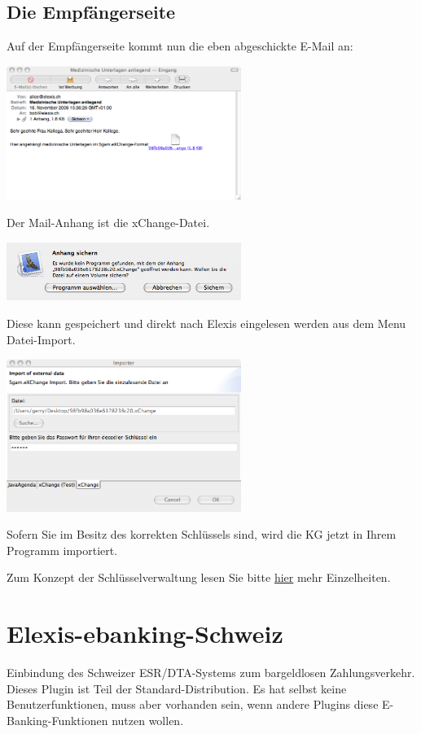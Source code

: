 \subsection{Die Empfängerseite}
Auf der Empfängerseite kommt nun die eben abgeschickte E-Mail an:

\includegraphics[width=3in]{images/import1.png}

Der Mail-Anhang ist die xChange-Datei.

\includegraphics[width=3in]{images/import2.png}

Diese kann gespeichert und direkt nach Elexis eingelesen werden aus dem Menu Datei-Import.

\includegraphics[width=3in]{images/import3.png}



Sofern Sie im Besitz des korrekten Schlüssels sind, wird die KG jetzt in Ihrem Programm importiert.

Zum Konzept der Schlüsselverwaltung lesen Sie bitte \href{http://www.elexis.ch/jp/index.php?option=content&task=view&id=64}{hier} mehr Einzelheiten.

\section{Elexis-ebanking-Schweiz}
Einbindung des Schweizer ESR/DTA-Systems zum bargeldlosen Zahlungsverkehr. Dieses Plugin ist Teil der Standard-Distribution. Es hat selbst keine Benutzerfunktionen, muss aber vorhanden sein, wenn andere Plugins diese E-Banking-Funktionen nutzen wollen.
